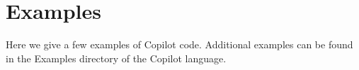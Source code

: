 \section{Examples} \label{sec:examples}

Here we give a few examples of Copilot code. Additional examples can be found in the Examples directory of the Copilot language. 

 \label{subsec:boyer_moore}

 \label{subsec:well_clear}